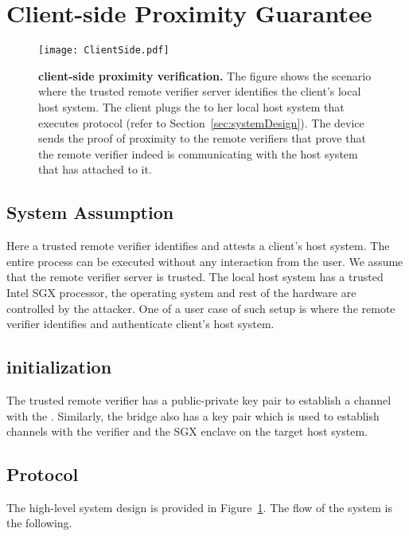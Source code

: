 \section{Client-side Proximity Guarantee}
\label{sec:clientSideProximity}

\begin{figure}[h]
 \centering
  \texttt{[image: ClientSide.pdf]}
 \caption{\textbf{\name client-side proximity verification.} The figure shows the scenario where the trusted remote verifier server identifies the client's local host system. The client plugs the \device to her local host system that executes \name protocol (refer to Section~\ref{sec:systemDesign}). The device sends the proof of proximity to the remote verifiers that prove that the remote verifier indeed is communicating with the host system that has \device attached to it.}
 \label{fig:systemClientVerification} 
\end{figure}

\subsection{System Assumption}

Here a trusted remote verifier identifies and attests a client's host system. The entire process can be executed without any interaction from the user. We assume that the remote verifier server is trusted. The local host system has a trusted Intel SGX processor, the operating system and rest of the hardware are controlled by the attacker. One of a user case of such setup is where the remote verifier identifies and authenticate client's host system. 


\subsection{initialization}

The trusted remote verifier has a public-private key pair to establish a \tls channel with the \device. Similarly, the bridge also has a key pair which is used to establish \tls channels with the verifier and the SGX enclave on the target host system. 

\subsection{Protocol}

The high-level system design is provided in Figure~\ref{fig:systemClientVerification}. The flow of the system is the following.

